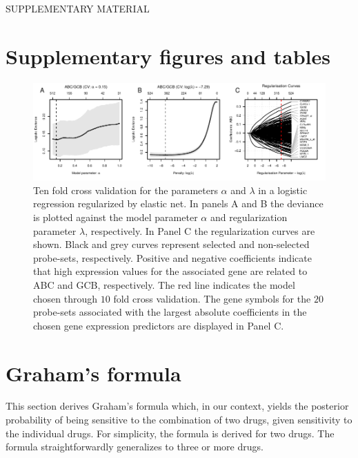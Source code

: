 % 
% 

{}
\begin{center}
{\huge SUPPLEMENTARY MATERIAL}\bigskip \\
{\bf \hemaClassTitle{}}
\end{center}

\section{Supplementary figures and tables}

\begin{figure}[htb]
\begin{center}
\includegraphics[width=1\textwidth]{figures/FigureS1.pdf}
\end{center}
\caption{Ten fold cross validation for the parameters $\alpha$ and $\lambda$ in a logistic regression regularized by elastic net.
In panels A and B the deviance is plotted against the model parameter $\alpha$ and regularization parameter $\lambda$, respectively.
In Panel C the regularization curves are shown.
Black and grey curves represent selected and non-selected probe-sets, respectively.
Positive and negative coefficients indicate that high expression values for the associated gene are related to ABC and GCB, respectively.
The red line indicates the model chosen through $10$ fold cross validation.
The gene symbols for the $20$ probe-sets associated with the largest absolute coefficients in the chosen gene expression predictors are displayed in Panel C.}
\label{fig:crossval}
\end{figure}





\clearpage



\section{Graham's formula}
\label{sec:graham}
This section derives Graham's formula which, in our context, yields the posterior probability of being sensitive to the combination of two drugs, given sensitivity to the individual drugs.
For simplicity, the formula is derived for two drugs.
The formula straightforwardly generalizes to three or more drugs.

